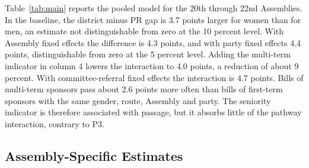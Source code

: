 \documentclass[11pt]{article}
\begin{document}
Table~\ref{tab:main} reports the pooled model for the 20th through 22nd Assemblies. In the baseline, the district minus PR gap is 3.7 points larger for women than for men, an estimate not distinguishable from zero at the 10 percent level. With Assembly fixed effects the difference is 4.3 points, and with party fixed effects 4.4 points, distinguishable from zero at the 5 percent level. Adding the multi-term indicator in column 4 lowers the interaction to 4.0 points, a reduction of about 9 percent. With committee-referral fixed effects the interaction is 4.7 points. Bills of multi-term sponsors pass about 2.6 points more often than bills of first-term sponsors with the same gender, route, Assembly and party. The seniority indicator is therefore associated with passage, but it absorbs little of the pathway interaction, contrary to P3.

\subsection{Assembly-Specific Estimates}
\end{document}
